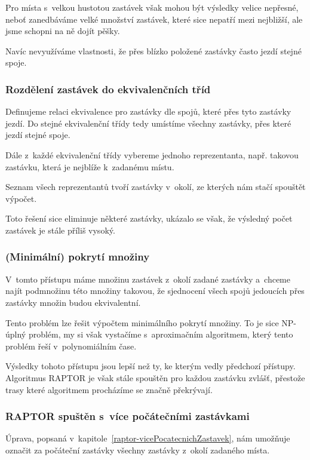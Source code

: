 Pro místa s~velkou hustotou zastávek však mohou být výsledky velice nepřesné, neboť zanedbáváme velké množství zastávek, které sice nepatří mezi nejbližší, ale jsme schopni na ně dojít pěšky.

Navíc nevyužíváme vlastnosti, že přes blízko položené zastávky často jezdí stejné spoje.

\subsubsection{Rozdělení zastávek do ekvivalenčních tříd}

Definujeme relaci ekvivalence pro zastávky dle spojů, které přes tyto zastávky jezdí. Do stejné ekvivalenční třídy tedy umístíme všechny zastávky, přes které jezdí stejné spoje.

Dále z~každé ekvivalenční třídy vybereme jednoho reprezentanta, např. takovou zastávku, která je nejblíže k~zadanému místu.

Seznam všech reprezentantů tvoří zastávky v~okolí, ze kterých nám stačí spouštět výpočet.

Toto řešení sice eliminuje některé zastávky, ukázalo se však, že výsledný počet zastávek je stále příliš vysoký.

\subsubsection{(Minimální) pokrytí množiny}

V~tomto přístupu máme množinu zastávek z~okolí zadané zastávky a~chceme najít podmnožinu této množiny takovou, že sjednocení všech spojů jedoucích přes zastávky množin budou ekvivalentní.

Tento problém lze řešit výpočtem minimálního pokrytí množiny. To je sice NP-úplný problém, my si však vystačíme s~aproximačním algoritmem, který tento problém řeší v~polynomiálním čase.

Výsledky tohoto přístupu jsou lepší než ty, ke kterým vedly předchozí přístupy. Algoritmus RAPTOR je však stále spouštěn pro každou zastávku zvlášť, přestože trasy které algoritmem procházíme se značně překrývají.

\subsubsection{RAPTOR spuštěn s~více počátečními zastávkami}\label{raptor-zobecneni-vicePocatecnichZastavek}

Úprava, popsaná v~kapitole~\ref{raptor-vicePocatecnichZastavek}, nám umožňuje označit za počáteční zastávky všechny zastávky z~okolí zadaného místa.

